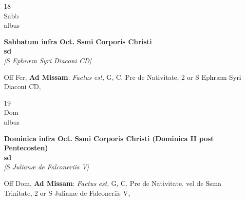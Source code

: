 \documentclass[10pt, openany]{book}
\begin{document}
        \begin{center}
            \begin{minipage}{3.5in}
                \vspace{2em}
                \begin{minipage}{0.5in}
                    {\Huge 18} \\
                    {\normalsize Sabb} \\
                    {\normalsize albus}
                \end{minipage}
                \begin{minipage}{3.0in}
                    \textbf{ \large Sabbatum infra Oct. Ssmi Corporis Christi \\
                    \textnormal{\normalsize sd}} \\ \textit{[S Ephræm Syri Diaconi CD]} \\ 
                \end{minipage}
                \begin{justify}Off Fer, \textbf{Ad Missam}: \textit{Factus est,} G, C, Pre de Nativitate, 2 or S Ephræm Syri Diaconi CD,   
                \end{justify}
            \end{minipage}
        \end{center}
    
        \begin{center}
            \begin{minipage}{3.5in}
                \vspace{2em}
                \begin{minipage}{0.5in}
                    {\Huge 19} \\
                    {\normalsize Dom} \\
                    {\normalsize albus}
                \end{minipage}
                \begin{minipage}{3.0in}
                    \textbf{ \large Dominica infra Oct. Ssmi Corporis Christi (Dominica II post Pentecosten) \\
                    \textnormal{\normalsize sd}} \\ \textit{[S Julianæ de Falconeriis V]} \\ 
                \end{minipage}
                \begin{justify}Off Dom, \textbf{Ad Missam}: \textit{Factus est,} G, C, Pre de Nativitate, vel de Ssma Trinitate, 2 or S Julianæ de Falconeriis V,   
                \end{justify}
            \end{minipage}
        \end{center}
    
\end{document}
